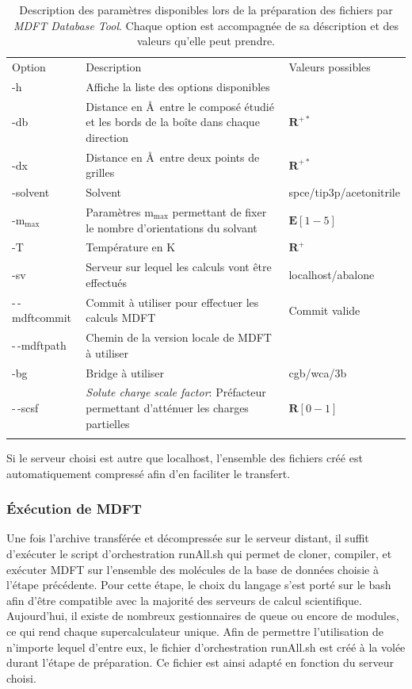 \begin{table}
  \begin{tabular}{l p{10cm} p{4cm}}
    \hline & \\[-1em]\hline
    Option   & Description  & Valeurs possibles \\
    \hline
    -h  & Affiche la liste des options disponibles & \\
    -db & Distance en \AA\ entre le composé étudié et les bords de la boîte dans chaque direction & $\mathbf{R}^{+*}$ \\
    -dx & Distance en \AA\ entre deux points de grilles & $\mathbf{R}^{+*}$ \\
    -solvent & Solvent & spce/tip3p/acetonitrile\\
    -$\mathrm{m}_\mathrm{max}$ & Paramètres $\mathrm{m}_\mathrm{max}$ permettant de fixer le nombre d'orientations du solvant & $\mathbf{E}[1-5]$ \\
    -T & Température en K & $\mathbf{R}^{+}$ \\
    -sv & Serveur sur lequel les calculs vont être effectués & localhost/abalone \\
    -\,-mdftcommit & Commit à utiliser pour effectuer les calculs MDFT & Commit valide \\
    -\,-mdftpath & Chemin de la version locale de MDFT à utiliser & \\
    -bg & Bridge à utiliser & cgb/wca/3b \\
    -\,-scsf & \textit{Solute charge scale factor}: Préfacteur permettant d'atténuer les charges partielles & $\mathbf{R}[0-1]$ \\
    \hline & \\[-1em]\hline
  \end{tabular}
  \caption[Description des paramètres disponibles lors de la préparation des fichiers par \textit{MDFT Database Tool}.]{Description des paramètres disponibles lors de la préparation des fichiers par \textit{MDFT Database Tool}. Chaque option est accompagnée de sa déscription et des valeurs qu'elle peut prendre.}
  \label{tab:processParameters}  
\end{table}

Si le serveur choisi est autre que localhost, l'ensemble des fichiers créé est automatiquement compressé afin d'en faciliter le transfert.


\subsubsection{\'Exécution de MDFT}
Une fois l'archive transférée et décompressée sur le serveur distant, il suffit d’exécuter le script d'orchestration runAll.sh qui permet de cloner, compiler, et exécuter MDFT sur l'ensemble des molécules de la base de données choisie à l'étape précédente. Pour cette étape, le choix du langage s'est porté sur le bash afin d'être compatible avec la majorité des serveurs de calcul scientifique. Aujourd'hui, il existe de nombreux gestionnaires de queue ou encore de modules, ce qui rend chaque supercalculateur unique. Afin de permettre l'utilisation de n'importe lequel d'entre eux, le fichier d'orchestration runAll.sh est créé à la volée durant l'étape de préparation. Ce fichier est ainsi adapté en fonction du serveur choisi.


